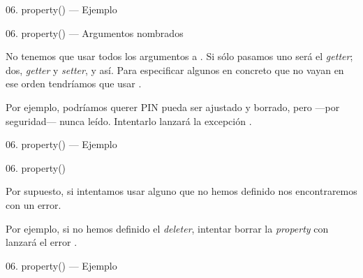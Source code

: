 \begin{frame}{06. property() — Ejemplo}
  \scriptsize
\end{frame}

\begin{frame}{06. property() — Argumentos nombrados}
  \begin{alertblock}{}
    \centering
    No tenemos que usar todos los argumentos a
    . Si sólo pasamos uno será el
    \textit{getter}; dos, \textit{getter} y \textit{setter}, y
    así. Para especificar algunos en concreto que no vayan en ese
    orden tendríamos que usar .
  \end{alertblock}

  \begin{center}
    \small
    Por ejemplo, podríamos querer PIN pueda ser ajustado y borrado,
    pero —por seguridad— nunca leído. Intentarlo lanzará la excepción
    .
  \end{center}
\end{frame}

\begin{frame}{06. property() — Ejemplo}
  \scriptsize
\end{frame}

\begin{frame}{06. property()}
  \begin{alertblock}{}
    \large
    \centering
    Por supuesto, si intentamos usar alguno que no hemos definido nos
    encontraremos con un error.
  \end{alertblock}

  \begin{center}
    \small
    Por ejemplo, si no hemos definido el \textit{deleter}, intentar
    borrar la \textit{property} con  lanzará el error
    .
  \end{center}
\end{frame}

\begin{frame}{06. property() — Ejemplo}
  \scriptsize
\end{frame}

